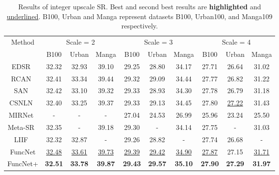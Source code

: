 \documentclass{article}
\begin{document}
{\begin{table}
\caption{Results of integer upscale SR. Best and second best results are \textbf{highlighted} and \underline{underlined}. B100, Urban and Manga represent datasets B100, Urban100, and Manga109 respectively.}
\label{tab:table2}
\begin{adjustbox}{center}
\begin{tabular}{|c|c|c|c|c|c|c|c|c|c|}
\hline
\multirow{2}{*}{Method} & \multicolumn{3}{c|}{Scale = 2} & \multicolumn{3}{c|}{Scale = 3} & \multicolumn{3}{c|}{Scale = 4} \\ \cline{2-10}
& B100 & Urban & Manga & B100 & Urban & Manga & B100 & Urban & Manga \\ \hline
EDSR~\cite{lim2017enhanced} & 32.32 & 32.93 & 39.10 & 29.25 & 28.80 & 34.17 & 27.71 & 26.64 & 31.02 \\
RCAN~\cite{zhang2018image} & 32.41 & 33.34 & 39.44 & 29.32 & 29.09 & 34.44 & 27.77 & 26.82 & 31.22 \\
SAN~\cite{dai2019second} & 32.42 & 33.10 & 39.32 & 29.33 & 28.93 & 34.30 & 27.78 & 26.79 & 31.18 \\
CSNLN~\cite{mei2020image} & 32.40 & 33.25 & 39.37 & 29.33 & 29.13 & 34.45 & 27.80 & \underline{27.22} & 31.43 \\
MIRNet~\cite{zamir2020learning} & - & - & - & 27.04 & 24.53 & 26.99 & 25.96 & 23.24 & 25.50 \\
Meta-SR~\cite{hu2019meta} & 32.35 & - & 39.18 & 29.30 & - & 34.14 & 27.75 & - & 31.03 \\
LIIF~\cite{chen2021learning} & 32.32 & 32.87 & - & 29.26 & 28.82 & - & 27.74 & 26.68 & - \\
FuncNet & \underline{32.48} & \underline{33.61} & \underline{39.73} & \underline{29.39} & \underline{29.42} & \underline{34.90} & \underline{27.87} & 27.15 & \underline{31.71} \\
FuncNet+ & \textbf{32.51} & \textbf{33.78} & \textbf{39.87} & \textbf{29.43} & \textbf{29.57} & \textbf{35.10} & \textbf{27.90} & \textbf{27.29} & \textbf{31.97} \\ \hline
\end{tabular}
\end{adjustbox}
\bigskip


\end{table}}
\end{document}
